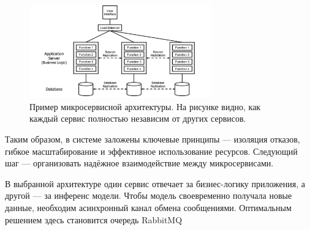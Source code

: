 \begin{figure}[H]
    \centering
    \includegraphics[width=0.7\textwidth]{styles/diploma/inc/microservice1.png} 
    \caption{Пример микросервисной архитектуры. На рисунке видно, как каждый сервис полностью независим от других сервисов.}
    \label{fig:example}
\end{figure}

Таким образом, в системе заложены ключевые принципы — изоляция отказов, гибкое масштабирование и эффективное использование ресурсов. Следующий шаг — организовать надёжное взаимодействие между микросервисами.

В выбранной архитектуре один сервис отвечает за бизнес-логику приложения, а другой — за инференс модели. Чтобы модель своевременно получала новые данные, необходим асинхронный канал обмена сообщениями. Оптимальным решением здесь становится очередь RabbitMQ



